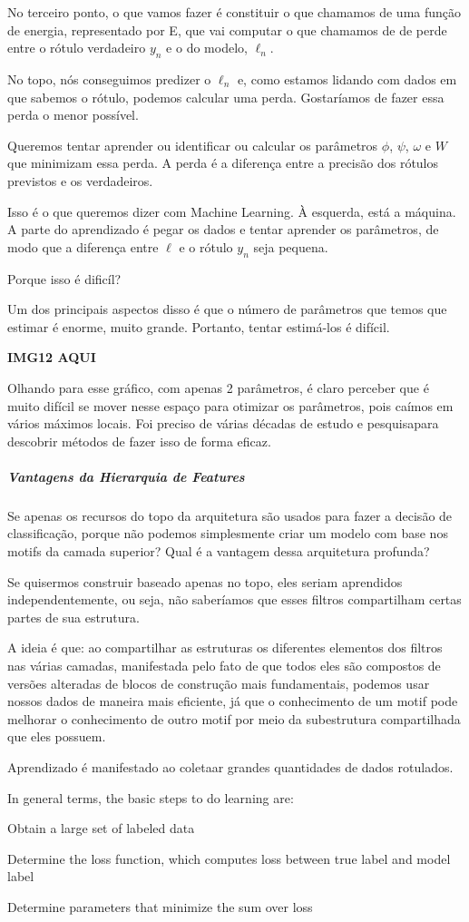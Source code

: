 \documentclass[11pt, a4paper]{article}
\begin{document}
No terceiro ponto, o que vamos fazer é constituir o que chamamos de uma função de energia, representado por E, que vai computar o que chamamos de de perde entre o rótulo verdadeiro $y_n$ e o do modelo, $\ell _n$.

No topo, nós conseguimos predizer o $\ell _n$ e, como estamos lidando com dados em que sabemos o rótulo, podemos calcular uma perda. Gostaríamos de fazer essa perda o menor possível.

Queremos tentar aprender ou identificar ou calcular os parâmetros $\phi$, $\psi$, $\omega$ e $W$ que minimizam essa perda. A perda é a diferença entre a precisão dos rótulos previstos e os verdadeiros.

Isso é o que queremos dizer com Machine Learning. À esquerda, está a máquina. A parte do aprendizado é pegar os dados e tentar aprender os parâmetros, de modo que a diferença entre $\ell$ e o rótulo $y_n$ seja pequena.

Porque isso é dificíl?

Um dos principais aspectos disso é que o número de parâmetros que temos que estimar é enorme, muito grande. Portanto, tentar estimá-los é difícil.

\textbf{IMG12 AQUI}

Olhando para esse gráfico, com apenas 2 parâmetros, é claro perceber que é muito difícil se mover nesse espaço para otimizar os parâmetros, pois caímos em vários máximos locais. Foi preciso de várias décadas de estudo e pesquisapara descobrir métodos de fazer isso de forma eficaz.

\subparagraph{Vantagens da Hierarquia de Features}

Se apenas os recursos do topo da arquitetura são usados para fazer a decisão de classificação, porque não podemos simplesmente criar um modelo com base nos motifs da camada superior? Qual é a vantagem dessa arquitetura profunda?

Se quisermos construir baseado apenas no topo, eles seriam aprendidos independentemente, ou seja, não saberíamos que esses filtros compartilham certas partes de sua estrutura. 

A ideia é que: ao compartilhar as estruturas os diferentes elementos dos filtros nas várias camadas, manifestada pelo fato de que todos eles são compostos de versões alteradas de blocos de construção mais fundamentais, podemos usar nossos dados de maneira mais eficiente, já que o conhecimento  de um motif pode melhorar o conhecimento de outro motif por meio da subestrutura compartilhada que eles possuem.

\begin{center}
Aprendizado é manifestado ao coletaar grandes quantidades de dados rotulados.

In general terms, the basic steps to do learning are:

Obtain a large set of labeled data

Determine the loss function, which computes loss between true label and model label

Determine parameters that minimize the sum over loss

\end{center}
\end{document}
